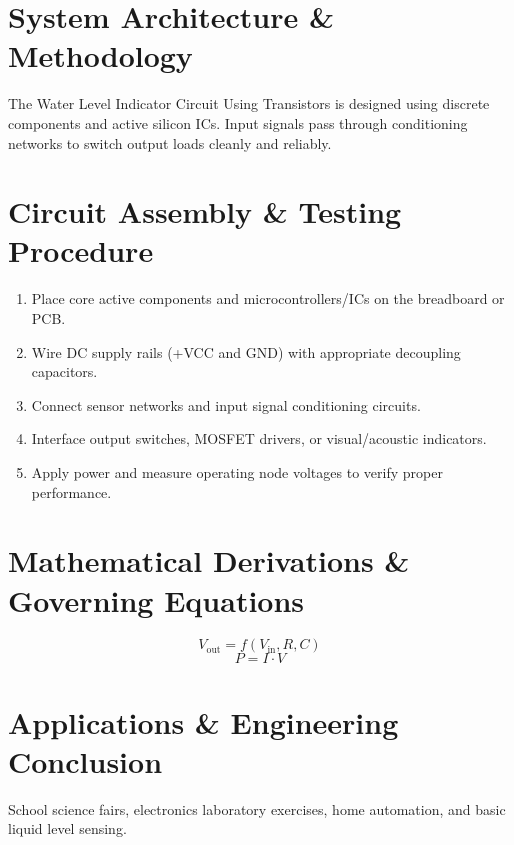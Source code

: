 \documentclass[11pt,a4paper]{article}
\begin{document}
\section{System Architecture \& Methodology}
The Water Level Indicator Circuit Using Transistors is designed using discrete components and active silicon ICs. Input signals pass through conditioning networks to switch output loads cleanly and reliably.

\section{Circuit Assembly \& Testing Procedure}
\begin{enumerate}
    \item Place core active components and microcontrollers/ICs on the breadboard or PCB.
    \item Wire DC supply rails (+VCC and GND) with appropriate decoupling capacitors.
    \item Connect sensor networks and input signal conditioning circuits.
    \item Interface output switches, MOSFET drivers, or visual/acoustic indicators.
    \item Apply power and measure operating node voltages to verify proper performance.
\end{enumerate}

\section{Mathematical Derivations \& Governing Equations}
\begin{equation}
V_{\text{out}} = f(V_{\text{in}}, R, C)
\end{equation}
\begin{equation}
P = I \cdot V
\end{equation}

\section{Applications \& Engineering Conclusion}
School science fairs, electronics laboratory exercises, home automation, and basic liquid level sensing.
\end{document}
